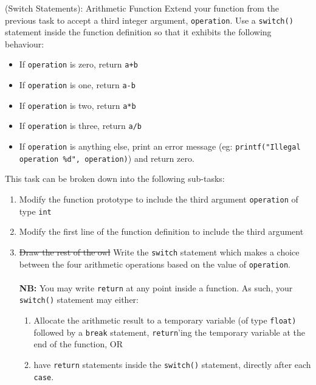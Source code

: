 \documentclass{lab}
\begin{document}
\begin{task}{(Switch Statements): Arithmetic Function}{}
Extend your function from the previous task to accept a third integer argument, \texttt{operation}. Use a \texttt{switch()} statement inside the function definition so that it exhibits the following behaviour:
\\
\begin{itemize}
\item If \texttt{operation} is zero, return \texttt{a+b}
\item If \texttt{operation} is one, return \texttt{a-b}
\item If \texttt{operation} is two, return \texttt{a*b}
\item If \texttt{operation} is three, return \texttt{a/b}
\item If \texttt{operation} is anything else, print an error message (eg: \texttt{printf("Illegal operation \%d", operation)}) and return zero.
\end{itemize}
This task can be broken down into the following sub-tasks:
\begin{enumerate}
\item Modify the function prototype to include the third argument \texttt{operation} of type \texttt{int}
\item Modify the first line of the function definition to include the third argument
\item \st{Draw the rest of the owl} Write the \texttt{switch} statement which makes a choice between the four arithmetic operations based on the value of \texttt{operation}.\\~\\ \textbf{NB:} You may write \texttt{return} at any point inside a function. As such, your \texttt{switch()} statement may either:
\begin{enumerate}
\item Allocate the arithmetic result to a temporary variable (of type \texttt{float)} followed by a \texttt{break} statement, \texttt{return}'ing the temporary variable at the end of the function, OR
\item have \texttt{return} statements inside the \texttt{switch()} statement, directly after each \texttt{case}.
\end{enumerate}
\end{enumerate}
\end{task}
\end{document}
